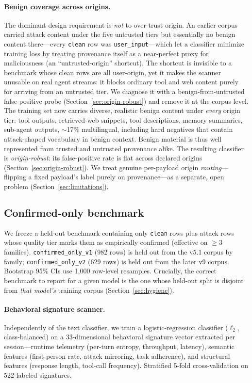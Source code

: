 \documentclass{article}
\begin{document}
\paragraph{Benign coverage across origins.}
The dominant design requirement is \emph{not} to over-trust origin. An earlier corpus carried attack content under the five untrusted tiers but essentially no benign content there---every \texttt{clean} row was \texttt{user\_input}---which let a classifier minimize training loss by treating provenance itself as a near-perfect proxy for maliciousness (an ``untrusted-origin'' shortcut). The shortcut is invisible to a benchmark whose clean rows are all user-origin, yet it makes the scanner unusable on real agent streams: it blocks ordinary tool and web content purely for arriving from an untrusted tier. We diagnose it with a benign-from-untrusted false-positive probe (Section~\ref{sec:origin-robust}) and remove it at the corpus level. The training set now carries diverse, realistic benign content under \emph{every} origin tier: tool outputs, retrieved-web snippets, tool descriptions, memory summaries, sub-agent outputs, $\sim$17\% multilingual, including hard negatives that contain attack-shaped vocabulary in benign context. Benign material is thus well represented from trusted and untrusted provenance alike. The resulting classifier is \emph{origin-robust}: its false-positive rate is flat across declared origins (Section~\ref{sec:origin-robust}). We treat genuine per-payload origin \emph{routing}---flipping a fixed payload's label purely on provenance---as a separate, open problem (Section~\ref{sec:limitations}).

\subsection{Confirmed-only benchmark}
We freeze a held-out benchmark containing only \texttt{clean} rows plus attack rows whose quality tier marks them as empirically confirmed (effective on $\geq3$ families). \texttt{confirmed\_only\_v1} (982 rows) is held out from the v5.1 corpus by family; \texttt{confirmed\_only\_v2} (629 rows) is held out from the later v9 corpus. Bootstrap 95\% CIs use 1{,}000 row-level resamples. Crucially, the correct benchmark to report for a given model is the one whose held-out split is disjoint from \emph{that model's} training corpus (Section~\ref{sec:hygiene}).

\paragraph{Behavioral signature scanner.}
Independently of the text classifier, we train a logistic-regression classifier ($\ell_2$, class-balanced) on a 33-dimensional behavioral signature vector extracted per session---runtime telemetry (per-turn entropy, throughput, latency), semantic features (first-person rate, attack mirroring, task adherence), and structural features (response length, tool-call frequency). Stratified 5-fold cross-validation on 522 labeled signatures.
\end{document}

